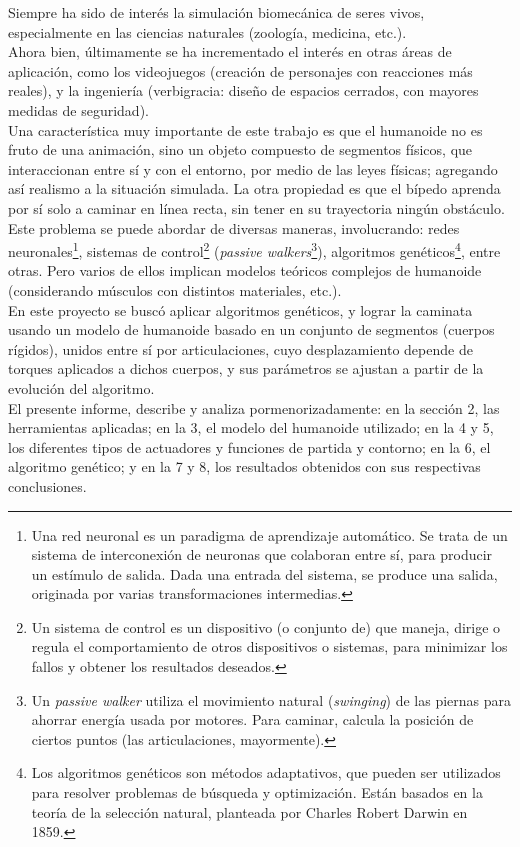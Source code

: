\documentclass{article}
\begin{document}
Siempre ha sido de inter\'es la simulaci\'on biomec\'anica de seres vivos, especialmente en las ciencias naturales (zoolog\'ia, medicina, etc.). \\
Ahora bien, \'ultimamente se ha incrementado el inter\'es en otras \'areas de aplicaci\'on, como los videojuegos (creaci\'on de personajes con reacciones m\'as reales), y la ingenier\'ia (verbigracia: dise\~no de espacios cerrados, con mayores medidas de seguridad).\\
Una caracter\'istica muy importante de este trabajo es que el humanoide no es fruto de una animaci\'on, sino un objeto compuesto de segmentos f\'isicos, que interaccionan entre s\'i y con el entorno, por medio de las leyes f\'isicas; agregando as\'i realismo a la situaci\'on simulada.  La otra propiedad es que el b\'ipedo aprenda por s\'i solo a caminar en l\'inea recta, sin tener en su trayectoria ning\'un obst\'aculo.\\
Este problema se puede abordar de diversas maneras, involucrando: redes neuronales\footnote{Una red neuronal es un paradigma de aprendizaje autom\'atico. Se trata de un sistema de interconexi\'on de neuronas que colaboran entre s\'i, para producir un est\'imulo de salida. Dada una entrada del sistema, se produce una salida, originada por varias transformaciones intermedias.}, sistemas de control\footnote{Un sistema de control es un dispositivo (o conjunto de) que maneja, dirige o regula el comportamiento de otros dispositivos o sistemas, para minimizar los fallos y obtener los resultados deseados.} (\textit{passive walkers}\footnote{Un \textit{passive walker} utiliza el movimiento natural (\textit{swinging}) de las piernas para ahorrar energ\'ia usada por motores. Para caminar, calcula la posici\'on de ciertos puntos (las articulaciones, mayormente).})\cite{Wojtyra}, algoritmos gen\'eticos\footnote{Los algoritmos gen\'eticos son m\'etodos adaptativos, que pueden ser utilizados para resolver problemas de b\'usqueda y optimizaci\'on. Est\'an basados en la teor\'ia de la selecci\'on natural, planteada por Charles Robert Darwin en 1859.}\cite{flexibleMuscle}, entre otras. Pero varios de ellos implican modelos te\'oricos complejos de humanoide (considerando m\'usculos con distintos materiales, etc.). \\ 
En este proyecto se busc\'o aplicar algoritmos gen\'eticos, y lograr la caminata usando un modelo de humanoide basado en un conjunto de segmentos (cuerpos r\'igidos), unidos entre s\'i por articulaciones, cuyo desplazamiento depende de torques aplicados a dichos cuerpos, y sus par\'ametros se ajustan a partir de la evoluci\'on del algoritmo. \\
El presente informe, describe y analiza pormenorizadamente: en la secci\'on 2, las herramientas aplicadas; en la 3, el modelo del humanoide utilizado; en la 4 y 5, los diferentes tipos de actuadores y funciones de partida y contorno; en la 6, el algoritmo gen\'etico; y en la 7 y 8, los resultados obtenidos con sus respectivas conclusiones.
\end{document}
